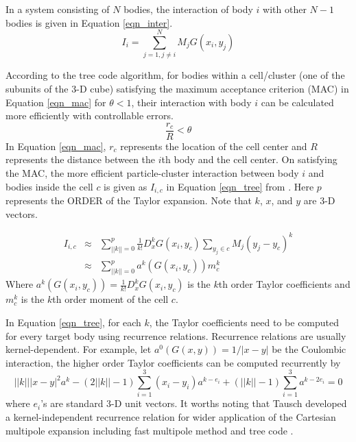 \documentclass[draftclsnofoot]{elsarticle}
\begin{document}
{\color{red}
In a system consisting of $N$ bodies, 
the interaction of  body $i$ with other $N-1$ bodies is given in Equation \ref{eqn_inter}.  
\begin{equation}
\label{eqn_inter}
I_i = \sum\limits_{j=1,j\ne i}^{N} M_jG(x_i,y_j)
\end{equation}

According to the tree code algorithm, 
for bodies within a cell/cluster (one of the subunits of the 3-D cube) 
satisfying the maximum acceptance criterion (MAC) \cite{mac}  in Equation \ref{eqn_mac} for $\theta < 1$,  
their interaction with body $i$ can be calculated more efficiently with controllable errors. 
\begin{equation}
\label{eqn_mac}
\frac{r_c}{R}<\theta 
\end{equation}
In Equation \ref{eqn_mac}, $r_c$ represents the location of the cell center and $R$ represents the distance between the $i$th body
and the cell center. On satisfying the MAC, the more efficient particle-cluster interaction between body $i$ and bodies inside the cell $c$ is given  as 
$I_{i,c}$ in Equation \ref{eqn_tree} from \cite{krasny1,li,vortex}. Here $p$ represents the ORDER of the Taylor expansion. Note that $k$, $x$, and $y$ are 3-D vectors. 

\begin{eqnarray}
\label{eqn_tree}
I_{i,c} &\approx& \sum\limits_{||k||=0}^{p} \frac{1}{k!}D^{k}_{x}G(x_i,y_c) \sum\limits_{y_j \in c}M_j{(y_j-y_c)}^k\\
\label{eqn_tree2}
&\approx& \sum\limits_{||k||=0}^{p} a^k(G(x_i, y_c))m^k_c
\end{eqnarray}
Where $a^k(G(x_i, y_c))=\frac{1}{k!}D^{k}_{x}G(x_i,y_c)$ is the $k$th order Taylor coefficients and $m^k_c
$ is the $k$th order moment of the cell $c$. 

In Equation \ref{eqn_tree}, for each $k$, the 
Taylor coefficients need to be computed for every target body using recurrence relations. Recurrence relations are usually kernel-dependent. For example, let $a^0(G(x, y))=1/|x-y|$ be the Coulombic interaction, the higher order Taylor coefficients can be computed recurrently by
\begin{equation}
||{k}|| |{ x}-{ y}|^2 a^{ k}-(2||{ k}||-1)
\sum_{i=1}^3 (x_i-y_i)a^{{ k}-{ e}_i}
+ (||{ k}||-1)\sum_{i=1}^3 a^{{ k}-2{ e}_i} = 0\nonumber 
\label{recurrence_1} 
\end{equation}
where $e_i$'s are standard 3-D unit vectors.  It worths noting that Tausch developed a kernel-independent recurrence relation for wider application of the Cartesian multipole expansion including fast multipole method and tree code \cite{tausch}.   


}
\end{document}
